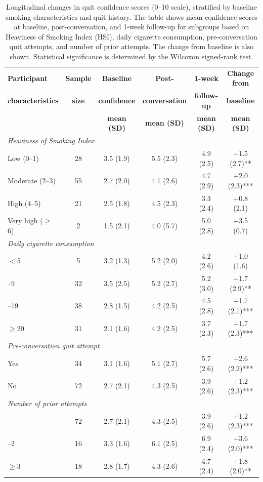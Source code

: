 \begin{table}[ht!]
	\centering
	\small
	\renewcommand{\arraystretch}{1.1}
	\begin{tabular*}{\linewidth}{@{\extracolsep{\fill}}lccccc@{}}
		\toprule
		\textbf{Participant} & \textbf{Sample} & \textbf{Baseline} & \textbf{Post-} & \textbf{1-week} & \textbf{Change from} \\
		\textbf{characteristics} & \textbf{size} & \textbf{confidence} & \textbf{conversation} & \textbf{follow-up} & \textbf{baseline} \\
		& & \textbf{mean (SD)} & \textbf{mean (SD)} & \textbf{mean (SD)} & \textbf{mean (SD)} \\
		\midrule
		\multicolumn{6}{l}{\textit{Heaviness of Smoking Index}} \\
		\quad Low (0--1) & 28 & 3.5 (1.9) & 5.5 (2.3) & 4.9 (2.5) & +1.5 (2.7)** \\
		\quad Moderate (2--3) & 55 & 2.7 (2.0) & 4.1 (2.6) & 4.7 (2.9) & +2.0 (2.3)*** \\
		\quad High (4--5) & 21 & 2.5 (1.8) & 4.5 (2.3) & 3.3 (2.4) & +0.8 (2.1) \\
		\quad Very high ($\geq$6) & 2 & 1.5 (2.1) & 4.0 (5.7) & 5.0 (2.8) & +3.5 (0.7) \\
		\midrule
		\multicolumn{6}{l}{\textit{Daily cigarette consumption}} \\
		\quad $<$5 & 5 & 3.2 (1.3) & 5.2 (2.0) & 4.2 (2.6) & +1.0 (1.6) \\
		\quad 5--9 & 32 & 3.5 (2.5) & 5.2 (2.7) & 5.2 (3.0) & +1.7 (2.9)** \\
		\quad 10--19 & 38 & 2.8 (1.5) & 4.2 (2.5) & 4.5 (2.8) & +1.7 (2.1)*** \\
		\quad $\geq$20 & 31 & 2.1 (1.6) & 4.2 (2.5) & 3.7 (2.3) & +1.7 (2.3)*** \\
		\midrule
		\multicolumn{6}{l}{\textit{Pre-conversation quit attempt}} \\
		\quad Yes & 34 & 3.1 (1.6) & 5.1 (2.7) & 5.7 (2.6) & +2.6 (2.2)*** \\
		\quad No & 72 & 2.7 (2.1) & 4.3 (2.5) & 3.9 (2.6) & +1.2 (2.3)*** \\
		\midrule
		\multicolumn{6}{l}{\textit{Number of prior attempts}} \\
		\quad 0 & 72 & 2.7 (2.1) & 4.3 (2.5) & 3.9 (2.6) & +1.2 (2.3)*** \\
		\quad 1--2 & 16 & 3.3 (1.6) & 6.1 (2.5) & 6.9 (2.4) & +3.6 (2.0)*** \\
		\quad $\geq$3 & 18 & 2.8 (1.7) & 4.3 (2.6) & 4.7 (2.4) & +1.8 (2.0)** \\
		\bottomrule
	\end{tabular*}
	\caption[Confidence Changes by Smoking Characteristics]{Longitudinal changes in quit confidence scores (0--10 scale), stratified by baseline smoking characteristics and quit history. The table shows mean confidence scores at baseline, post-conversation, and 1-week follow-up for subgroups based on Heaviness of Smoking Index (HSI), daily cigarette consumption, pre-conversation quit attempts, and number of prior attempts. The change from baseline is also shown. Statistical significance is determined by the Wilcoxon signed-rank test.}
	\label{tab:hsi_prequit}
\end{table}


